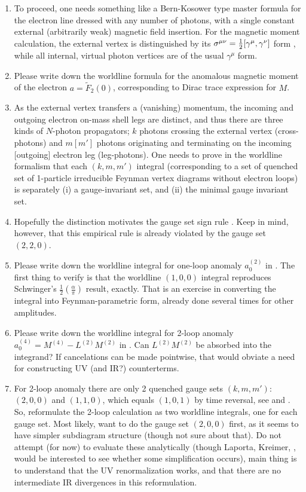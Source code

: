 \begin{enumerate}
  \item
To proceed, one needs something like a Bern-Kosower type
master formula for the electron line dressed with any number of photons,
with a single constant external (arbitrarily weak) magnetic field insertion.
For the magnetic moment calculation, the external vertex is distinguished
by its
\(
\sigma^{\mu\nu}={1\over 2}[\gamma^{\mu},\gamma^{\nu}]
\)
form , while all internal, virtual photon vertices
are of the usual $\gamma^{\mu}$ form.
  \item
Please write down
the worldline formula for the anomalous magnetic moment
of the electron $a=\tilde{F}_2(0)$, corresponding to Dirac trace
expression  for $M$.
  \item
As the external vertex transfers a (vanishing) momentum, the
incoming and outgoing electron on-mass shell legs are distinct, and thus
there are three kinds of $N$-photon propagators; $k$ photons crossing the
external vertex (cross-photons) and $m [m']$ photons originating and
terminating on the incoming [outgoing] electron leg (leg-photons). One
needs to prove in the worldline formalism that each $(k,m,m')$
integral (corresponding to a set of quenched set of 1-particle
irreducible Feynman vertex diagrams without electron loops) is separately
(i) a gauge-invariant set, and
(ii) the minimal gauge invariant set.
  \item
Hopefully the distinction motivates the  gauge set sign rule
. Keep in mind, however, that this empirical rule is
already violated by the gauge set $(2,2,0)$.
  \item
Please write down
the worldline integral for one-loop anomaly $a_{0}^{(2)}$ in
.
The first thing to verify is that the worldline $(1,0,0)$ integral
reproduces Schwinger's $\frac{1}{2}\left(\frac{\alpha}{\pi}\right)$
result, exactly. That is an exercise in converting the
integral into Feynman-parametric form, already done several times for
other amplitudes.
  \item
Please write down the worldline integral for 2-loop anomaly
$a_{0}^{(4)}=M^{(4)}-L^{(2)}M^{(2)}$ in .
Can $L^{(2)}M^{(2)}$ be absorbed into the integrand? If cancelations can
be made pointwise, that would obviate a need for constructing UV  (and
IR?) counterterms.
  \item
For 2-loop anomaly there are only 2 quenched gauge sets $(k,m,m')$:
$(2,0,0)$ and $(1,1,0)$, which equals $(1,0,1)$ by time reversal, see
 and .
So, reformulate the 2-loop calculation as two worldline integrals,
one for each gauge set.
Most likely, want to do the gauge set $(2,0,0)$ first, as it seems to
have simpler subdiagram structure (though not sure about that).
Do not attempt (for now) to evaluate these analytically (though Laporta,
Kreimer, \etc, would be interested to see whether some simplification
occurs), main thing is to understand that the UV renormalization works,
and that there are no intermediate IR divergences in this reformulation.
\end{enumerate}
